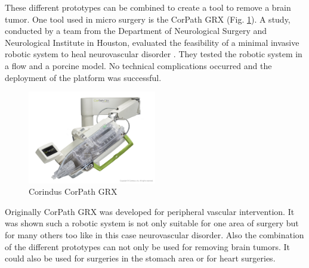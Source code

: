 These different prototypes can be combined to create a tool to remove a brain tumor. One tool used in micro surgery is the CorPath GRX (Fig. \ref{fig:corindusCorPath}).  A study, conducted by a team from the Department of Neurological Surgery and Neurological Institute in Houston, evaluated the feasibility of a minimal invasive robotic system to heal neurovascular disorder \cite{Neurovascular}. They tested the robotic system in a flow and a porcine model. No technical complications occurred and the deployment of the platform was successful.  
\begin{figure}[H]
    \centering
    \includegraphics[width=0.5\textwidth]{Figures/CorindusCorPathGRX_1.jpg}
    \caption{Corindus CorPath GRX}
    \label{fig:corindusCorPath}
\end{figure}
Originally CorPath GRX was developed for peripheral vascular intervention. It was shown such a robotic system is not only suitable for one area of surgery but for many others too like in this case neurovascular disorder. Also the combination of the different prototypes can not only be used for removing brain tumors. It could also be used for surgeries in the stomach area or for heart surgeries.

